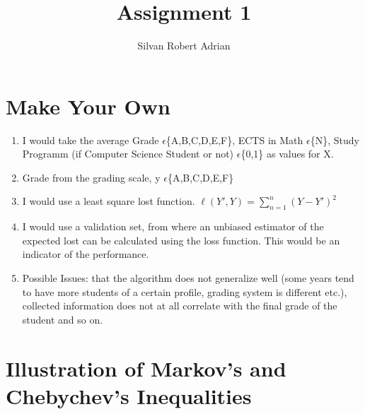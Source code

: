 \documentclass[a4paper]{article}
\title{\vspace{-5cm} Assignment 1}
\author{Silvan Robert Adrian}
\begin{document}
\maketitle

\tableofcontents

\section{Make Your Own}

\begin{enumerate}
  \item I would take the average Grade $\epsilon$\{A,B,C,D,E,F\}, ECTS in Math $\epsilon$\{N\}, Study Programm (if Computer Science Student or not) $\epsilon$\{0,1\} as values for X.
  \item Grade from the grading scale, y $\epsilon$\{A,B,C,D,E,F\}
  \item I would use a least square lost function. $ \ell(Y',Y) = \sum_{n=1}^{n}(Y-Y')^{2}$
  \item I would use a validation set, from where an unbiased estimator of the expected lost can be calculated using the loss function. This would be an indicator of the performance. 
  \item Possible Issues: that the algorithm does not generalize well (some years tend to have more students of a certain profile, grading system is different etc.), collected information does not at all correlate with the final grade of the student and so on.

\end{enumerate}

\section{Illustration of Markov's and Chebychev's Inequalities}
\end{document}
